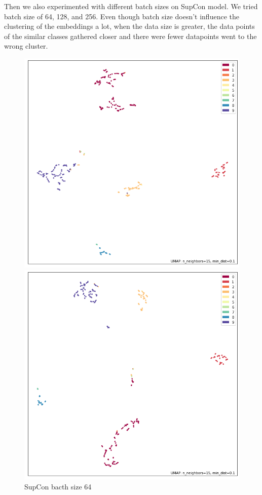 \documentclass{article}
\begin{document}
    Then we also experimented with different batch sizes on SupCon model. We tried batch size of 64, 128, and 256. 
    Even though batch size doesn't influence the clustering of the embeddings a lot, when the data size is greater, the data points of the similar classes gathered closer and there were fewer datapoints went to the wrong cluster.
    \begin{figure}[H]
        \begin{minipage}[b]{0.33\linewidth}
            \centering
            \includegraphics[width=\textwidth]{../results/supcon_64.png}
            \caption{SupCon bacth size 64}
            \label{fig:figure 2.1}
        \end{minipage}
        \begin{minipage}[b]{0.33\linewidth}
            \centering
            \includegraphics[width=\textwidth]{../results/supcon_128.png}

\end{minipage}
\end{figure}
\end{document}
